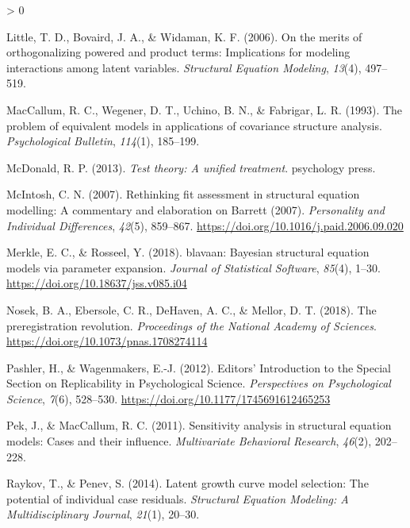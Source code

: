\documentclass[
  english,
  man]{apa6}
\newlength{\cslhangindent}
\newenvironment{CSLReferences}[2] %
 {%
  \setlength{\parindent}{0pt}
  \ifodd #1 \everypar{\setlength{\hangindent}{\cslhangindent}}\ignorespaces\fi
  \ifnum #2 > 0
  \setlength{\parskip}{#2\baselineskip}
  \fi
 }%
 {}
\begin{document}
\begin{CSLReferences}{1}{0}
\leavevmode\hypertarget{ref-little2006merits}{}%
Little, T. D., Bovaird, J. A., \& Widaman, K. F. (2006). On the merits of orthogonalizing powered and product terms: Implications for modeling interactions among latent variables. \emph{Structural Equation Modeling}, \emph{13}(4), 497--519.

\leavevmode\hypertarget{ref-MacCallum93}{}%
MacCallum, R. C., Wegener, D. T., Uchino, B. N., \& Fabrigar, L. R. (1993). The problem of equivalent models in applications of covariance structure analysis. \emph{Psychological Bulletin}, \emph{114}(1), 185--199.

\leavevmode\hypertarget{ref-mcdonald2013test}{}%
McDonald, R. P. (2013). \emph{Test theory: A unified treatment}. psychology press.

\leavevmode\hypertarget{ref-McIntosh2007}{}%
McIntosh, C. N. (2007). {Rethinking fit assessment in structural equation modelling: A commentary and elaboration on Barrett (2007)}. \emph{Personality and Individual Differences}, \emph{42}(5), 859--867. \url{https://doi.org/10.1016/j.paid.2006.09.020}

\leavevmode\hypertarget{ref-blavaan}{}%
Merkle, E. C., \& Rosseel, Y. (2018). {blavaan}: Bayesian structural equation models via parameter expansion. \emph{Journal of Statistical Software}, \emph{85}(4), 1--30. \url{https://doi.org/10.18637/jss.v085.i04}

\leavevmode\hypertarget{ref-Nosek2018}{}%
Nosek, B. A., Ebersole, C. R., DeHaven, A. C., \& Mellor, D. T. (2018). {The preregistration revolution}. \emph{Proceedings of the National Academy of Sciences}. \url{https://doi.org/10.1073/pnas.1708274114}

\leavevmode\hypertarget{ref-Pashler2012a}{}%
Pashler, H., \& Wagenmakers, E.-J. (2012). {Editors' Introduction to the Special Section on Replicability in Psychological Science}. \emph{Perspectives on Psychological Science}, \emph{7}(6), 528--530. \url{https://doi.org/10.1177/1745691612465253}

\leavevmode\hypertarget{ref-pek2011sensitivity}{}%
Pek, J., \& MacCallum, R. C. (2011). Sensitivity analysis in structural equation models: Cases and their influence. \emph{Multivariate Behavioral Research}, \emph{46}(2), 202--228.

\leavevmode\hypertarget{ref-raykov2014latent}{}%
Raykov, T., \& Penev, S. (2014). Latent growth curve model selection: The potential of individual case residuals. \emph{Structural Equation Modeling: A Multidisciplinary Journal}, \emph{21}(1), 20--30.


\end{CSLReferences}
\end{document}
